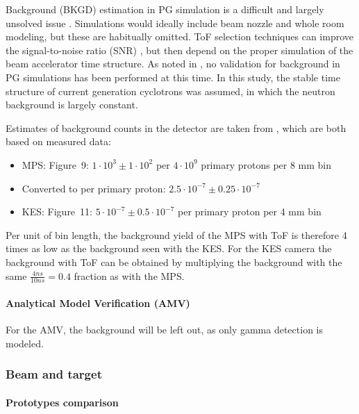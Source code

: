 \documentclass[a4paper,english,12pt]{article}
\begin{document}
Background (BKGD) estimation in PG simulation is a difficult and largely unsolved issue \citep{Huisman2016,Sterpin2015,Pinto2014a,Perali2014}. Simulations would ideally include beam nozzle and whole room modeling, but these are habitually omitted. ToF selection techniques can improve the signal-to-noise ratio (SNR) \citep{Testa2008,Roellinghoff2014a}, but then depend on the proper simulation of the beam accelerator time structure. As noted in \cite{Huisman2016}, no validation for background in PG simulations has been performed at this time. In this study, the stable time structure of current generation cyclotrons was assumed, in which the neutron background is largely constant. 

Estimates of background counts in the detector are taken from \cite{Pinto2014a,Perali2014}, which are both based on measured data:

\begin{itemize}[noitemsep]
\item MPS: \cite{Pinto2014a} Figure~9: $1 \cdot 10^{3} \pm 1 \cdot 10^{2}$ per $4\cdot10^9$ primary protons per 8 mm bin
\item[] Converted to per primary proton: $2.5 \cdot 10^{-7} \pm 0.25 \cdot 10^{-7}$
\item KES: \cite{Perali2014} Figure~11: $5 \cdot 10^{-7} \pm 0.5 \cdot 10^{-7}$ per primary proton per 4 mm bin
\end{itemize}

Per unit of bin length, the background yield of the MPS with ToF is therefore 4 times as low as the background seen with the KES. For the KES camera the background with ToF can be obtained by multiplying the background with the same $\frac{4 ns}{10 ns} = 0.4$ fraction as with the MPS. 

\paragraph{Analytical Model Verification (AMV)}

For the AMV, the background will be left out, as only gamma detection is modeled.

\subsubsection{Beam and target}

\paragraph{Prototypes comparison}
\end{document}
